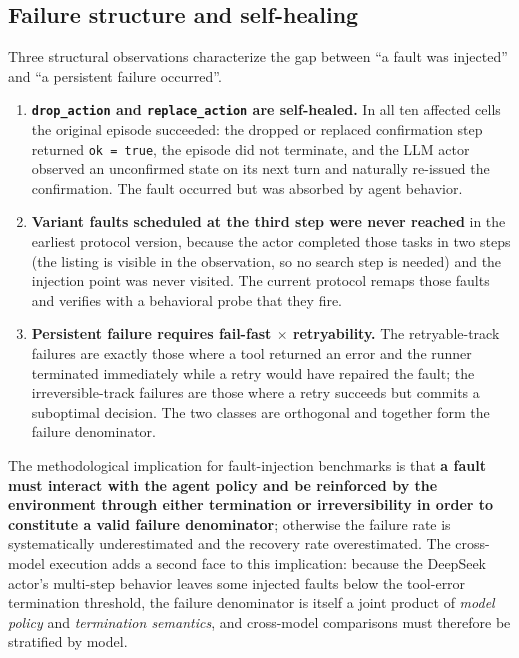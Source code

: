 \documentclass[10pt]{article}
\begin{document}
\subsection{Failure structure and self-healing}

Three structural observations characterize the gap between ``a fault was injected'' and ``a persistent failure occurred''.

\begin{enumerate}

  \item \textbf{\texttt{drop\_action} and \texttt{replace\_action} are self-healed.} In all ten affected cells the original episode succeeded: the dropped or replaced confirmation step returned \texttt{ok = true}, the episode did not terminate, and the LLM actor observed an unconfirmed state on its next turn and naturally re-issued the confirmation. The fault occurred but was absorbed by agent behavior.

  \item \textbf{Variant faults scheduled at the third step were never reached} in the earliest protocol version, because the actor completed those tasks in two steps (the listing is visible in the observation, so no search step is needed) and the injection point was never visited. The current protocol remaps those faults and verifies with a behavioral probe that they fire.

  \item \textbf{Persistent failure requires fail-fast $\times$ retryability.} The retryable-track failures are exactly those where a tool returned an error and the runner terminated immediately while a retry would have repaired the fault; the irreversible-track failures are those where a retry succeeds but commits a suboptimal decision. The two classes are orthogonal and together form the failure denominator.

\end{enumerate}

The methodological implication for fault-injection benchmarks is that \textbf{a fault must interact with the agent policy and be reinforced by the environment through either termination or irreversibility in order to constitute a valid failure denominator}; otherwise the failure rate is systematically underestimated and the recovery rate overestimated. The cross-model execution adds a second face to this implication: because the DeepSeek actor's multi-step behavior leaves some injected faults below the tool-error termination threshold, the failure denominator is itself a joint product of \emph{model policy} and \emph{termination semantics}, and cross-model comparisons must therefore be stratified by model.
\end{document}
